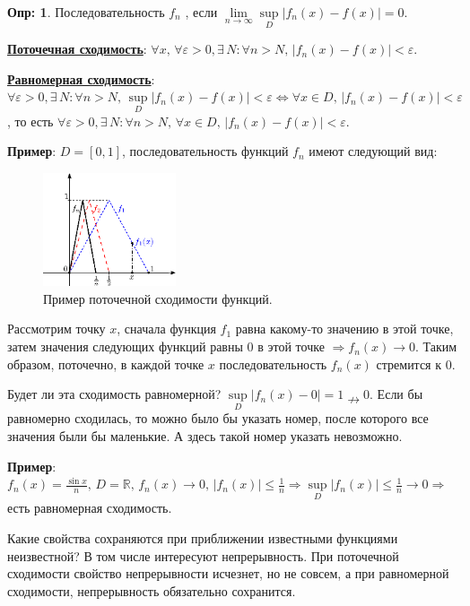 \documentclass[12pt]{article}
\newcommand{\MR}{\mathbb{R}}
\newcommand{\VE}{\varepsilon}
\theoremstyle{definition}
\newtheorem{defn}{Опр:}
\begin{document}
\begin{defn}
	Последовательность $f_n$ , если $\lim\limits_{n \to \infty}\sup\limits_{D}|f_n(x) - f(x)| = 0$.
\end{defn}

\uline{\textbf{Поточечная сходимость}}: $\forall x, \, \forall \VE >0, \exists \, N \colon \forall n > N, \, |f_n(x) - f(x)| < \VE$.

\uline{\textbf{Равномерная сходимость}}: $\forall \VE >0, \exists \, N \colon \forall n > N, \, \sup\limits_D|f_n(x) - f(x)| < \VE \Leftrightarrow \forall x \in D, \, |f_n(x) - f(x)| < \VE$, то есть $\forall \VE >0, \exists \, N \colon \forall n > N, \, \forall x \in D, \, |f_n(x) - f(x)| < \VE$.

\textbf{Пример}: $D = [0,1]$, последовательность функций $f_n$ имеют следующий вид:
\begin{figure}[H]
	\centering
	\includegraphics[width=0.35\textwidth]{20_6.eps}
	\caption{Пример поточечной сходимости функций.}
	\label{20_6}
\end{figure}

Рассмотрим точку $x$, сначала функция $f_1$ равна какому-то значению в этой точке, затем значения следующих функций равны $0$ в этой точке $\Rightarrow f_n(x) \to 0$. Таким образом, поточечно, в каждой точке $x$ последовательность $f_n(x)$ стремится к $0$.

Будет ли эта сходимость равномерной? $\sup\limits_{D}|f_n(x) - 0| = 1 \nrightarrow 0$. Если бы равномерно сходилась, то можно было бы указать номер, после которого все значения были бы маленькие. А здесь такой номер указать  невозможно.

\textbf{Пример}: $f_n(x) = \frac{\sin{x}}{n}, \, D = \MR, \, f_n(x) \to 0, \, |f_n(x)| \leq \frac{1}{n} \Rightarrow \sup\limits_{D}|f_n(x)| \leq \frac{1}{n} \to 0 \Rightarrow$ есть равномерная сходимость.

Какие свойства сохраняются при приближении известными функциями неизвестной? В том числе интересуют непрерывность. При поточечной сходимости свойство непрерывности исчезнет, но не совсем, а при равномерной сходимости, непрерывность обязательно сохранится.
\end{document}
